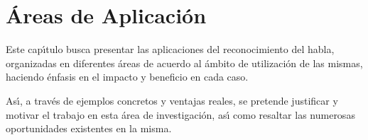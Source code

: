 \chapter{\'Areas de Aplicaci\'on}
\label{sec:aplicaciones}

Este cap{\'\i}tulo busca presentar las aplicaciones del reconocimiento del habla, organizadas en diferentes
\'areas de acuerdo al \'ambito de utilizaci\'on de las mismas, haciendo \'enfasis en el impacto y beneficio
en cada caso.

As{\'\i}, a trav\'es de ejemplos concretos y ventajas reales, se pretende justificar y motivar el trabajo
en esta \'area de investigaci\'on, as{\'\i} como resaltar las numerosas oportunidades existentes en la misma.








